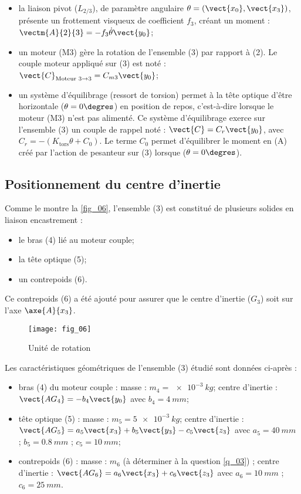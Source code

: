 \begin{itemize}
\begin{itemize}
\item la liaison pivot ($L_{2/3}$), de paramètre angulaire $\theta = \left(\vect{x_0} , \vect{x_3}\right)$, présente un frottement visqueux de coefficient $f_3$, créant un moment : $\vectm{A}{2}{3} = -f_3 \dot{\theta} \vect{y_0}$;
\item un moteur (M3) gère la rotation de l’ensemble (3) par rapport à (2). Le couple moteur appliqué
sur (3) est noté : $\vect{C}_{\text{Moteur 3}\rightarrow 3}=C_{m3}\vect{y_0}$;
\item un système d’équilibrage (ressort de torsion) permet à la tête optique d’être horizontale ($\theta = 0\degres$)
en position de repos, c’est-à-dire lorsque le moteur (M3) n’est pas alimenté. Ce système
d’équilibrage exerce sur l’ensemble (3) un couple de rappel noté : $\vect{C}=C_r \vect{y_0}$, avec
$C_r = -\left(K_{\text{tors}}\theta + C_0\right)$. Le terme $C_0$ permet d’équilibrer le moment en (A) créé par l’action de
pesanteur sur (3) lorsque ($\theta = 0\degres$).
\end{itemize}
\end{itemize}
\subsection{Positionnement du centre d'inertie}


Comme le montre la \autoref{fig_06}, l’ensemble (3) est constitué de plusieurs solides en liaison encastrement :
\begin{itemize}
\item le bras (4) lié au moteur couple;
\item la tête optique (5);
\item un contrepoids (6).
\end{itemize}
Ce contrepoids (6) a été ajouté pour assurer que le centre d’inertie ($G_3$) soit sur l’axe $\axe{A}{x_3}$.

\begin{figure}[H]
\centering
\texttt{[image: fig\_06]}
\caption{\label{fig_06} Unité de rotation}
\end{figure}

Les caractéristiques géométriques de l’ensemble (3) étudié sont données ci-après :
\begin{itemize}
\item bras (4) du moteur couple : masse : $m_4=\SI{e-3}{kg}$; centre d’inertie : $\vect{AG_4} = - b_4 \vect{y_0}$ avec $b_4 =  \SI{4}{mm}$;
\item tête optique (5) : masse : $m_5= \SI{5e-3}{kg}$; centre d’inertie : $\vect{AG_5}= a_5 \vect{x_3}+b_5 \vect{y_3}-c_5 \vect{z_3}$ avec $a_5 = \SI{40}{mm}$ ; $b_5 = \SI{0,8}{mm}$ ; $c_5 = \SI{10}{mm}$;
\item contrepoids (6) : masse : $m_6$ (à déterminer à la question \ref{q_03}) ; centre d’inertie :
$\vect{AG_6}= a_6 \vect{x_3}+c_6 \vect{z_3}$ avec $a_6 = \SI{10}{mm}$ ; $c_6 = \SI{25}{mm}$.
\end{itemize}

